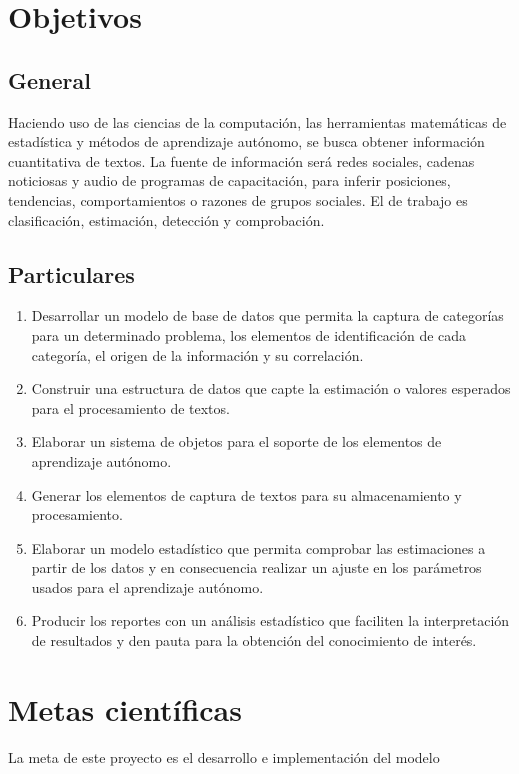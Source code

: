 \section {Objetivos}
\subsection {General}
Haciendo uso de las ciencias de la computación, las herramientas matemáticas de estadística y métodos de aprendizaje autónomo, se busca obtener información cuantitativa de textos. La fuente de información será redes sociales, cadenas noticiosas y audio de programas de capacitación, para inferir posiciones, tendencias, comportamientos o razones de grupos sociales. El de trabajo es clasificación, estimación, detección y comprobación.
\subsection {Particulares}
\begin{enumerate}
    \item Desarrollar un modelo de base de datos que permita la captura de categorías para un determinado problema, los elementos de identificación de cada categoría, el origen de la información y su correlación.
    \item Construir una estructura de datos que capte la estimación o valores esperados para el procesamiento de textos.
    \item Elaborar un sistema de objetos para el soporte de los elementos de aprendizaje autónomo.
    \item Generar los elementos de captura de textos para su almacenamiento y procesamiento.
    \item Elaborar un modelo estadístico que permita comprobar las estimaciones a partir de los datos y en consecuencia realizar un ajuste en los parámetros usados para el aprendizaje autónomo.
    \item Producir los reportes con un análisis estadístico que faciliten la interpretación de resultados y den pauta para la obtención del conocimiento de interés.
\end{enumerate}
\section {Metas científicas}
La meta de este proyecto es el desarrollo e implementación del modelo 